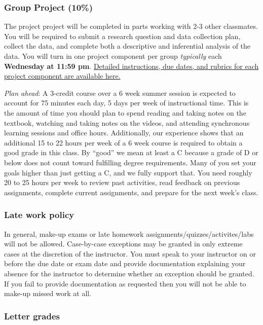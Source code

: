 \documentclass[
]{article}
\begin{document}
\subsubsection{Group Project (10\%)}\label{group-project-10}

The project project will be completed in parts working with 2-3 other
classmates. You will be required to submit a research question and data
collection plan, collect the data, and complete both a descriptive and
inferential analysis of the data. You will turn in one project component
per group \emph{typically} each \textbf{Wednesday at 11:59 pm}.
\href{https://docs.google.com/document/d/1M-uz_NFvCF685WA9Gm4wZMDITWx1aRr5bYMWaMVGZNU/edit?usp=sharing}{Detailed
instructions, due dates, and rubrics for each project component are
available here.}

\emph{Plan ahead}: A 3-credit course over a 6 week summer session is
expected to account for 75 minutes each day, 5 days per week of
instructional time. This is the amount of time you should plan to spend
reading and taking notes on the textbook, watching and taking notes on
the videos, and attending synchronous learning sessions and office
hours. Additionally, our experience shows that an additional 15 to 22
hours per week of a 6 week course is required to obtain a good grade in
this class. By ``good'' we mean at least a C because a grade of D or
below does not count toward fulfilling degree requirements. Many of you
set your goals higher than just getting a C, and we fully support that.
You need roughly 20 to 25 hours per week to review past activities, read
feedback on previous assignments, complete current assignments, and
prepare for the next week's class.

\subsubsection{Late work policy}\label{late-work-policy}

In general, make-up exams or late homework
assignments/quizzes/activites/labs will not be allowed. Case-by-case
exceptions may be granted in only extreme cases at the discretion of the
instructor. You must speak to your instructor on or before the due date
or exam date and provide documentation explaining your absence for the
instructor to determine whether an exception should be granted. If you
fail to provide documentation as requested then you will not be able to
make-up missed work at all.

\subsubsection{Letter grades}\label{letter-grades}
\end{document}
